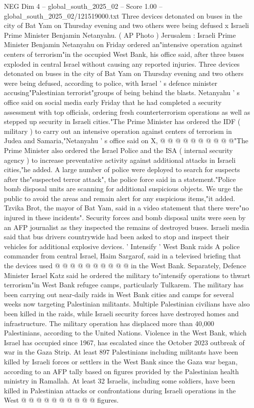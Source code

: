 \begin{textsample}{NEG Dim 4 – global\_south\_2025\_02 – Score 1.00 – global\_south\_2025\_02/121519000.txt}  \label{ex:f4_neg_436}
Three devices detonated on buses in the city of Bat Yam on Thursday evening and two others were being defused x Israeli Prime Minister Benjamin Netanyahu. ( AP Photo ) Jerusalem : Israeli Prime Minister Benjamin Netanyahu on Friday ordered an"intensive operation against centers of terrorism"in the occupied West Bank, his office said, after three buses exploded in central Israel without causing any reported injuries.
Three devices detonated on buses in the city of Bat Yam on Thursday evening and two others were being defused, according to police, with Israel ' s defence minister accusing"Palestinian terrorist"groups of being behind the blasts.
Netanyahu ' s office said on social media early Friday that he had completed a security assessment with top officials, ordering fresh counterterrorism operations as well as stepped up security in Israeli cities."The Prime Minister has ordered the IDF ( military ) to carry out an intensive operation against centers of terrorism in Judea and Samaria,"Netanyahu ' s office said on X, @ @ @ @ @ @ @ @ @ @"The Prime Minister also ordered the Israel Police and the ISA ( internal security agency ) to increase preventative activity against additional attacks in Israeli cities,"he added.
A large number of police were deployed to search for suspects after the"suspected terror attack", the police force said in a statement."Police bomb disposal units are scanning for additional suspicious objects.
We urge the public to avoid the areas and remain alert for any suspicious items,"it added.
Tzvika Brot, the mayor of Bat Yam, said in a video statement that there were"no injured in these incidents".
Security forces and bomb disposal units were seen by an AFP journalist as they inspected the remains of destroyed buses.
Israeli media said that bus drivers countrywide had been asked to stop and inspect their vehicles for additional explosive devices. ' Intensify ' West Bank raids A police commander from central Israel, Haim Sargarof, said in a televised briefing that the devices used @ @ @ @ @ @ @ @ @ @ in the West Bank.
Separately, Defence Minister Israel Katz said he ordered the military to"intensify operations to thwart terrorism"in West Bank refugee camps, particularly Tulkarem.
The military has been carrying out near-daily raids in West Bank cities and camps for several weeks now targeting Palestinian militants.
Multiple Palestinian civilians have also been killed in the raids, while Israeli security forces have destroyed homes and infrastructure.
The military operation has displaced more than 40,000 Palestinians, according to the United Nations.
Violence in the West Bank, which Israel has occupied since 1967, has escalated since the October 2023 outbreak of war in the Gaza Strip.
At least 897 Palestinians including militants have been killed by Israeli forces or settlers in the West Bank since the Gaza war began, according to an AFP tally based on figures provided by the Palestinian health ministry in Ramallah.
At least 32 Israelis, including some soldiers, have been killed in Palestinian attacks or confrontations during Israeli operations in the West @ @ @ @ @ @ @ @ @ @ figures.

\end{textsample}
